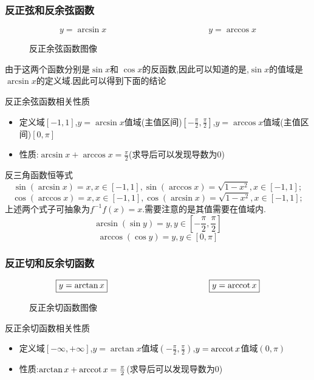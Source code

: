 \documentclass[12pt, a4paper, oneside, UTF8]{ctexbook}  %
\begin{document}
\subsubsection{反正弦和反余弦函数}
$$
    \boxed{y=\arcsin x}
    \qquad \qquad \qquad \qquad \qquad \qquad
    \boxed{y=\arccos x}
$$
\begin{figure}[H] \centering
    \caption{反正余弦函数图像}
\end{figure}
由于这两个函数分别是$\sin x$和 $\cos x$的反函数,因此可以知道的是,$\sin x$的值域是$\arcsin x$的定义域.因此可以得到下面的结论
\begin{criterion}{反正余弦函数相关性质}{}
    \begin{itemize}
        \item 定义域$[-1,1]$,$y=\arcsin x$值域(主值区间)$[-\frac{\pi}{2},\frac{\pi}{2}]$,$y=\arccos x$值域(主值区间)$[0,\pi]$
        \item 性质:$\arcsin x+\arccos x=\frac{\pi}{2}$(求导后可以发现导数为0)
    \end{itemize}
\end{criterion}
\begin{criterion}{反三角函数恒等式}{}
    $$
        \sin(\arcsin x)=x,x\in[-1,1],\sin(\arccos x)=\sqrt{1-x^2},x\in[-1,1];
    $$
    $$
        \cos(\arccos x)=x,x\in[-1,1],\cos(\arcsin x)=\sqrt{1-x^2},x\in[-1,1];
    $$
    上述两个式子可抽象为$f^{-1}f(x)=x$.需要注意的是其值需要在值域内.
    $$
        \arcsin(\sin y)=y,y\in\left[-\frac{\pi}{2},\frac{\pi}{2}\right]
    $$
    $$
        \arccos(\cos y)=y,y\in\left[0,\pi\right]
    $$
\end{criterion}
\subsubsection{反正切和反余切函数}
$$
    \boxed{y=\arctan x}
    \qquad \qquad \qquad \qquad \qquad \qquad
    \boxed{y=\mathrm{arccot}\, x}
$$
\begin{figure}[H] \centering
    \caption{反正余切函数图像}
\end{figure}
\begin{criterion}{反正余切函数相关性质}{}
    \begin{itemize}
        \item 定义域$[-\infty,+\infty]$,$y=\arctan x$值域$(-\frac{\pi}{2},\frac{\pi}{2})$,$y=\mathrm{arccot}\, x$值域$(0,\pi)$
        \item 性质:$\arctan x+\mathrm{arccot}\, x=\frac{\pi}{2}$(求导后可以发现导数为0)
    \end{itemize}
\end{criterion}
\end{document}
